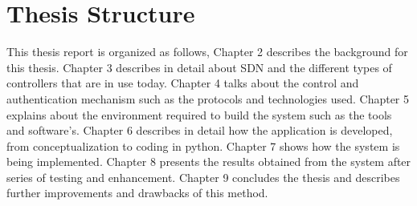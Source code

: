 \section{Thesis Structure}\label{sec:Structure}
This thesis report is organized as follows, Chapter 2 describes the background for this thesis. Chapter 3 describes in detail about SDN and the different types of controllers that are in use today. Chapter 4 talks about the control and authentication mechanism such as the protocols and technologies used. Chapter 5 explains about the environment required to build the system such as the tools and software’s. Chapter 6 describes in detail how the application is developed, from conceptualization to coding in python. Chapter 7 shows how the system is being implemented. Chapter 8 presents the results obtained from the system after series of testing and enhancement. Chapter 9 concludes the thesis and describes further improvements and drawbacks of this method.